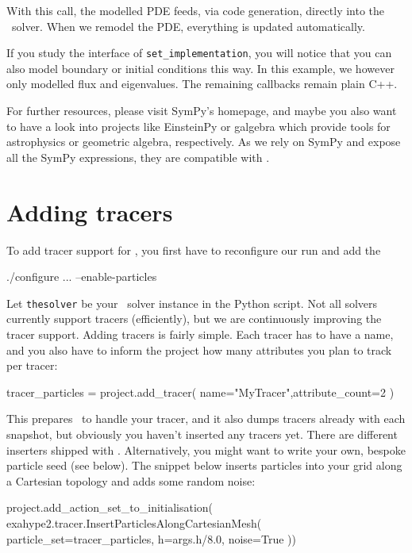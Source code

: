 \noindent
With this call, the modelled PDE feeds, via code generation, directly into the
\ExaHyPE\ solver. When we remodel the PDE, everything is updated automatically.


If you study the interface of \texttt{set\_implementation}, you will notice that
you can also model boundary or initial conditions this way.
In this example, we however only modelled flux and eigenvalues.
The remaining callbacks remain plain C++.


For further resources, please visit SymPy's homepage, and maybe you also want to
have a look into projects like EinsteinPy or galgebra which provide tools for
astrophysics or geometric algebra, respectively.
As we rely on SymPy and expose all the SymPy expressions, they are compatible
with \ExaHyPE.




\section{Adding tracers}

To add tracer support for \ExaHyPE, you first have to reconfigure our run and
add the 
\begin{code}
./configure ... --enable-particles
\end{code}

\noindent
Let \texttt{thesolver} be your \ExaHyPE\ solver instance in the Python script.
Not all solvers currently support tracers (efficiently), but we are continuously
improving the tracer support.
Adding tracers is fairly simple.
Each tracer has to have a name, and you also have to inform the project how many
attributes you plan to track per tracer:

\begin{code}
tracer_particles = project.add_tracer( name="MyTracer",attribute_count=2 )
\end{code} 


\noindent
This prepares \ExaHyPE\ to handle your tracer, and it also dumps tracers already
with each snapshot, but obviously you haven't inserted any tracers yet. 
There are different inserters shipped with \ExaHyPE. 
Alternatively, you might want to write your own, bespoke particle seed (see
below).
The snippet below inserts particles into your grid along a Cartesian topology
and adds some random noise:


\begin{code}
project.add_action_set_to_initialisation( 
 exahype2.tracer.InsertParticlesAlongCartesianMesh( 
  particle_set=tracer_particles,
  h=args.h/8.0, noise=True 
))
\end{code}



